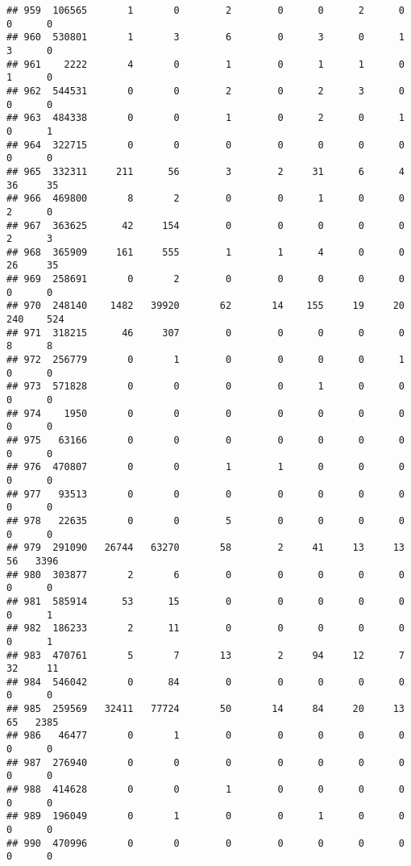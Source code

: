 \documentclass[
]{article}
\begin{document}
\begin{verbatim}
## 959  106565       1       0        2        0      0      2      0     0      0
## 960  530801       1       3        6        0      3      0      1     3      0
## 961    2222       4       0        1        0      1      1      0     1      0
## 962  544531       0       0        2        0      2      3      0     0      0
## 963  484338       0       0        1        0      2      0      1     0      1
## 964  322715       0       0        0        0      0      0      0     0      0
## 965  332311     211      56        3        2     31      6      4    36     35
## 966  469800       8       2        0        0      1      0      0     2      0
## 967  363625      42     154        0        0      0      0      0     2      3
## 968  365909     161     555        1        1      4      0      0    26     35
## 969  258691       0       2        0        0      0      0      0     0      0
## 970  248140    1482   39920       62       14    155     19     20   240    524
## 971  318215      46     307        0        0      0      0      0     8      8
## 972  256779       0       1        0        0      0      0      1     0      0
## 973  571828       0       0        0        0      1      0      0     0      0
## 974    1950       0       0        0        0      0      0      0     0      0
## 975   63166       0       0        0        0      0      0      0     0      0
## 976  470807       0       0        1        1      0      0      0     0      0
## 977   93513       0       0        0        0      0      0      0     0      0
## 978   22635       0       0        5        0      0      0      0     0      0
## 979  291090   26744   63270       58        2     41     13     13    56   3396
## 980  303877       2       6        0        0      0      0      0     0      0
## 981  585914      53      15        0        0      0      0      0     0      1
## 982  186233       2      11        0        0      0      0      0     0      1
## 983  470761       5       7       13        2     94     12      7    32     11
## 984  546042       0      84        0        0      0      0      0     0      0
## 985  259569   32411   77724       50       14     84     20     13    65   2385
## 986   46477       0       1        0        0      0      0      0     0      0
## 987  276940       0       0        0        0      0      0      0     0      0
## 988  414628       0       0        1        0      0      0      0     0      0
## 989  196049       0       1        0        0      1      0      0     0      0
## 990  470996       0       0        0        0      0      0      0     0      0

\end{verbatim}
\end{document}
